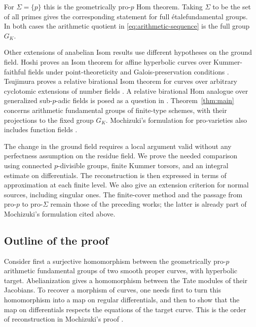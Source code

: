 \documentclass[11pt,a4paper]{article}
\numberwithin{equation}{section}
\theoremstyle{plain}
\theoremstyle{definition}
\theoremstyle{remark}
\newcommand{\etale}{\'etale}
\renewcommand{\S}{\ensuremath{\mathsection}}
\begin{document}
For $\Sigma=\{p\}$ this is the geometrically pro-$p$ Hom theorem. Taking
$\Sigma$ to be the set of all primes gives the corresponding statement for
full \etale fundamental groups. In both cases the arithmetic quotient in
\eqref{eq:arithmetic-sequence} is the full group $G_K$.

Other extensions of anabelian Isom results use different hypotheses on
the ground field. Hoshi proves an Isom theorem for affine hyperbolic
curves over Kummer-faithful fields under point-theoreticity and
Galois-preservation conditions \cite[Theorem~A]{Hoshi2017}.
Tsujimura proves a relative birational Isom theorem for curves over
arbitrary cyclotomic extensions of number fields
\cite[Corollary~B]{Tsujimura2023}. A relative birational Hom analogue
over generalized sub-$p$-adic fields is posed as a question in
\cite[Introduction, Remark~(a)]{Tsujimura2026}.
Theorem~\ref{thm:main} concerns arithmetic fundamental groups of
finite-type schemes, with their projections to the fixed group $G_K$.
Mochizuki's formulation for pro-varieties also includes function fields
\cite[Definition~16.4 and Theorem~16.5]{Mochizuki1999}.

The change in the ground field requires a local argument valid without
any perfectness assumption on the residue field. We prove the needed
comparison using connected $p$-divisible groups, finite Kummer torsors,
and an integral estimate on differentials. The reconstruction is then
expressed in terms of approximation at each finite level. We also give
an extension criterion for normal sources, including singular ones.
The finite-cover method and the passage from pro-$p$ to pro-$\Sigma$
remain those of the preceding works; the latter is already part of
Mochizuki's formulation cited above.

\subsection*{Outline of the proof}

Consider first a surjective homomorphism between the geometrically pro-$p$
arithmetic fundamental groups of two smooth proper curves, with hyperbolic
target. Abelianization gives a homomorphism between the Tate modules of
their Jacobians. To recover a morphism of curves, one needs first to turn
this homomorphism into a map on regular differentials, and then to show
that the map on differentials respects the equations of the target curve.
This is the order of reconstruction in Mochizuki's proof
\cite[\S\S7--14]{Mochizuki1999}.
\end{document}
